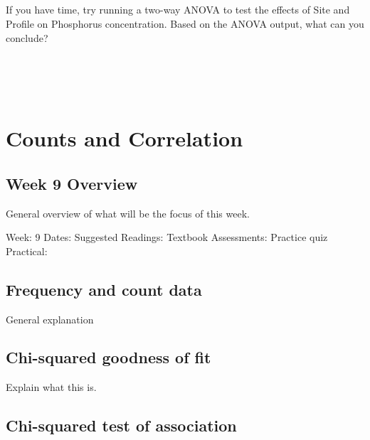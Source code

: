 \documentclass[
]{scrbook}
\begin{document}
\begin{verbatim}





\end{verbatim}

If you have time, try running a two-way ANOVA to test the effects of Site and Profile on Phosphorus concentration.
Based on the ANOVA output, what can you conclude?

\begin{verbatim}




\end{verbatim}

\hypertarget{part-counts-and-correlation}{%
\part{Counts and Correlation}\label{part-counts-and-correlation}}

\hypertarget{Week9}{%
\chapter*{Week 9 Overview}\label{Week9}}

General overview of what will be the focus of this week.

Week: 9
Dates:
Suggested Readings: Textbook
Assessments: Practice quiz
Practical:

\hypertarget{frequency-and-count-data}{%
\chapter{Frequency and count data}\label{frequency-and-count-data}}

General explanation

\hypertarget{chi-squared-goodness-of-fit}{%
\chapter{Chi-squared goodness of fit}\label{chi-squared-goodness-of-fit}}

Explain what this is.

\hypertarget{chi-squared-test-of-association}{%
\chapter{Chi-squared test of association}\label{chi-squared-test-of-association}}
\end{document}
